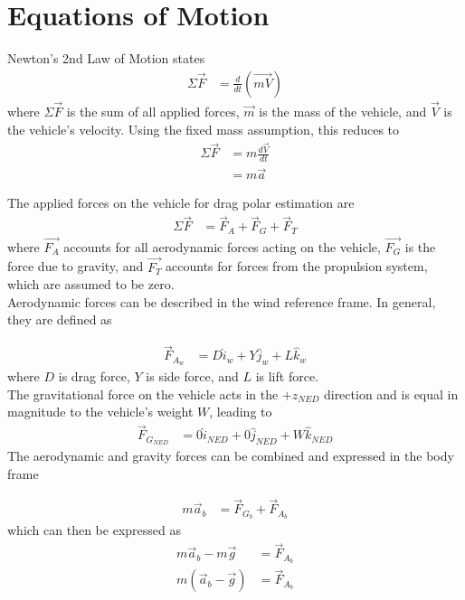 \section{Equations of Motion}
\label{sys-desc}
Newton's 2nd Law of Motion states
\begin{align}
\Sigma\vec{F} &= \frac{d}{dt}(\vec{mV})
\end{align}
\noindent
where $\Sigma\vec{F}$ is the sum of all applied forces, $\vec{m}$ is the mass of the vehicle, and $\vec{V}$ is the vehicle's velocity. Using the fixed mass assumption, this reduces to 
\begin{align}
\Sigma\vec{F} &= m\frac{d\vec{V}}{dt}\\
&= m\vec{a}
\end{align}

The applied forces on the vehicle for drag polar estimation are 
\begin{align}
\Sigma\vec{F} &= \vec{F}_{A}+\vec{F}_{G}+\vec{F}_{T}
\end{align}
\noindent
where $\vec{F_{A}}$ accounts for all aerodynamic forces acting on the vehicle, $\vec{F_{G}}$ is the force due to gravity, and $\vec{F_{T}}$ accounts for forces from the propulsion system, which are assumed to be zero.\\
Aerodynamic forces can be described in the wind reference frame. In general, they are defined as

\begin{align}
\vec{F}_{A_w} &= D \hat{i}_w+Y \hat{j}_w+L \hat{k}_w
\end{align}
\noindent
where $D$ is drag force, $Y$ is side force, and $L$ is lift force.\\
The gravitational force on the vehicle acts in the $+z_{NED}$ direction and is equal in magnitude to the vehicle's weight $W$, leading to
\begin{align}
\vec{F}_{G_{NED}} &= 0\hat{i}_{NED}+0\hat{j}_{NED}+W\hat{k}_{NED}
\end{align}
The aerodynamic and gravity forces can be combined and expressed in the body frame

\begin{align}
m\vec{a}_b &= \vec{F}_{G_b} + \vec{F}_{A_b}
\end{align}
\noindent
which can then be expressed as 
\begin{align}
m\vec{a}_b - m\vec{g} &= \vec{F}_{A_b}\\
m(\vec{a}_b - \vec{g}) &= \vec{F}_{A_b}
\label{accelerometerEqn}
\end{align}

